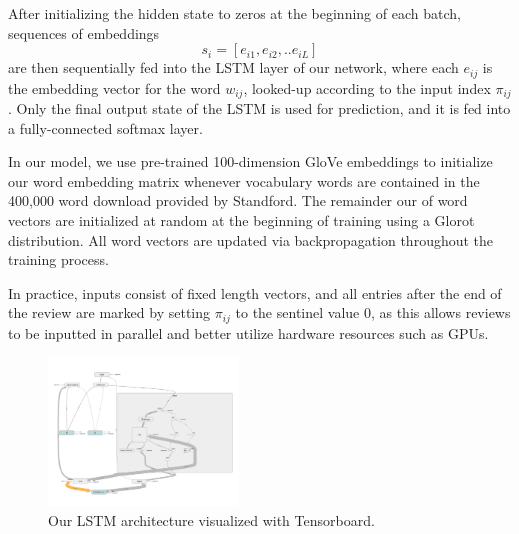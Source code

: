 \documentclass[conference]{IEEEtran}
\begin{document}
    After initializing the hidden state to zeros at the beginning of each batch, sequences
    of embeddings
    $$
    s_i = [ e_{i1}, e_{i2}, .. e_{iL}] 
    $$
    are then sequentially fed into the LSTM layer of our network, where each $e_{ij}$ is
    the embedding vector for the word $w_{ij}$, looked-up according to the input index
    $\pi_{ij}$. Only the final output state of the LSTM is used for prediction, and it is
    fed into a fully-connected softmax layer.
    
    In our model, we use pre-trained 100-dimension GloVe embeddings to initialize
    our word embedding matrix whenever vocabulary words are contained in the 
    400,000 word download provided by Standford\cite{pennington2014glove}. 
    The remainder our of word vectors are initialized at random at the beginning 
    of training using a Glorot distribution\cite{pmlr-v9-glorot10a}.
    All word vectors are updated via backpropagation
    throughout the training process. 
     
    In practice, inputs consist of fixed
    length vectors, and all entries after the end of the review are  marked by setting
    $\pi_{ij}$ to the sentinel value 0, as this allows reviews to be inputted in parallel and
    better utilize hardware resources such as GPUs.
    
    \begin{figure}
        \includegraphics[width=0.45\textwidth]{figure/lstm_architecture}
        \caption{Our LSTM architecture visualized with Tensorboard.}
    \end{figure}
\end{document}
